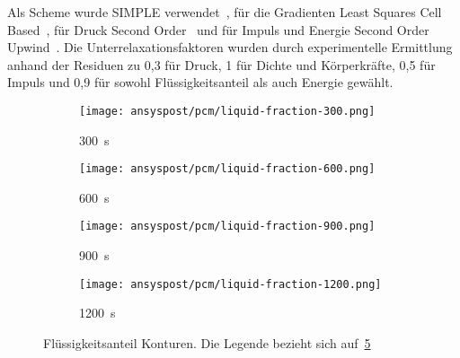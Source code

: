 Als Scheme wurde SIMPLE verwendet~\cite{akamcae-udf}, für die Gradienten Least Squares Cell Based~\cite{akamcae-udf}, für Druck Second Order~\cite{akamcae-udf} und für Impuls und Energie
Second Order Upwind~\cite{akamcae-udf}. Die Unterrelaxationsfaktoren wurden durch experimentelle Ermittlung anhand der Residuen zu 0,3 für Druck, 1 für Dichte
und Körperkräfte, 0,5 für Impuls und 0,9 für sowohl Flüssigkeitsanteil als auch Energie gewählt.

\begin{figure}
    \centering

    \begin{minipage}[t]{0.485\textwidth}
        \centering
        \setlength{\tabcolsep}{1pt} %
        \begin{subfigure}[t]{0.16\textwidth}
            \centering
        \end{subfigure}%
        \hspace{2mm}%
        \begin{subfigure}[t]{0.2\textwidth}
            \centering
            \texttt{[image: ansyspost/pcm/liquid-fraction-300.png]}
            \caption{\SI{300}{\second}}\label{fig:liquid_fraction_300}
        \end{subfigure}%
        \begin{subfigure}[t]{0.2\textwidth}
            \centering
            \texttt{[image: ansyspost/pcm/liquid-fraction-600.png]}
            \caption{\SI{600}{\second}}\label{fig:liquid_fraction_600}
        \end{subfigure}%
        \begin{subfigure}[t]{0.2\textwidth}
            \centering
            \texttt{[image: ansyspost/pcm/liquid-fraction-900.png]}
            \caption{\SI{900}{\second}}\label{fig:liquid_fraction_900}
        \end{subfigure}%
        \begin{subfigure}[t]{0.2\textwidth}
            \centering
            \texttt{[image: ansyspost/pcm/liquid-fraction-1200.png]}
            \caption{\SI{1200}{\second}}\label{fig:liquid_fraction_1200}
        \end{subfigure}
        \caption{Flüssigkeitsanteil Konturen. Die Legende bezieht sich auf~\ref{fig:liquid_fraction_1200}}

\end{minipage}
\end{figure}

